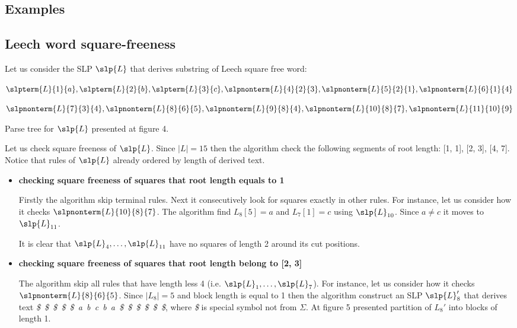 ﻿\begin{appendix}
\section{Examples}

\subsection{Leech word square-freeness}
Let us consider the SLP $\slp{L}$ that derives substring of Leech square free word: 

\begin{center}
$\slpterm{L}{1}{a}, \slpterm{L}{2}{b}, \slpterm{L}{3}{c}, \slpnonterm{L}{4}{2}{3}, \slpnonterm{L}{5}{2}{1},
\slpnonterm{L}{6}{1}{4}$

$\slpnonterm{L}{7}{3}{4}, \slpnonterm{L}{8}{6}{5}, \slpnonterm{L}{9}{8}{4}, \slpnonterm{L}{10}{8}{7},
\slpnonterm{L}{11}{10}{9}$
\end{center}

Parse tree for $\slp{L}$ presented at figure 4.

\begin{figure}[th]
\LeechSLP
\end{figure}

Let us check square freeness of $\slp{L}$. Since $|L| = 15$ then the algorithm check the following segments of root
length: [1, 1], [2, 3], [4, 7]. Notice that rules of $\slp{L}$ already ordered by length of derived text.

\begin{itemize}
  \item \textbf{checking square freeness of squares that root length equals to 1}
  
  Firstly the algorithm skip terminal rules. Next it consecutively look for squares exactly in other rules. For
  instance, let us consider how it checks $\slpnonterm{L}{10}{8}{7}$. The algorithm find $L_8[5] = a$ and $L_7[1] = c$
  using $\slp{L}_{10}$. Since $a \neq c$ it moves to $\slp{L}_{11}$.
  
  It is clear that $\slp{L}_4, \dots, \slp{L}_{11}$ have no squares of length 2 around its cut positions.
  \item \textbf{checking square freeness of squares that root length belong to [2, 3]}
  
  The algorithm skip all rules that have length less 4 (i.e. $\slp{L}_1, \dots, \slp{L}_7$). For instance, let us
  consider how it checks $\slpnonterm{L}{8}{6}{5}$. Since $|L_8| = 5$ and block length is equal to 1 then the algorithm
  construct an SLP $\slp{L}_8'$ that derives text \emph{\$~\$~\$~\$~\$~a~b~c~b~a~\$~\$~\$~\$~\$~\$}, where \emph{\$} is
  special symbol not from $\Sigma$. At figure 5 presented partition of $L_8'$ into blocks of length 1.
  

\end{itemize}
\end{appendix}
